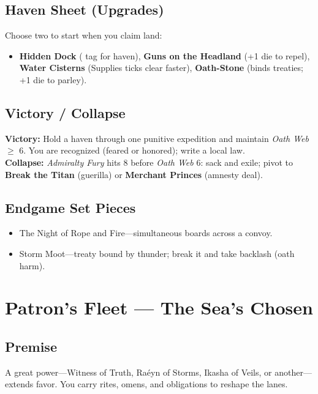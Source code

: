 \documentclass[11pt,oneside]{book}
\newcommand{\tagpill}[1]{\begingroup
  \setlength{\fboxsep}{1pt}\color{black}\fbox{\footnotesize\textsf{#1}}
\endgroup}
\begin{document}
\begin{itemize}
\subsection*{Haven Sheet (Upgrades)}
Choose two to start when you claim land:
\begin{itemize}[leftmargin=*,itemsep=2pt]
  \item \textbf{Hidden Dock} (\tagpill{HIDDEN HOLD} tag for haven), \textbf{Guns on the Headland} (+1 die to repel), \textbf{Water Cisterns} (Supplies ticks clear faster), \textbf{Oath-Stone} (binds treaties; +1 die to parley).
\end{itemize}

\subsection*{Victory / Collapse}
\textbf{Victory:} Hold a haven through one punitive expedition and maintain \emph{Oath Web} \(\geq\) 6. You are recognized (feared or honored); write a local law.\\
\textbf{Collapse:} \emph{Admiralty Fury} hits 8 before \emph{Oath Web} 6: sack and exile; pivot to \textbf{Break the Titan} (guerilla) or \textbf{Merchant Princes} (amnesty deal).

\subsection*{Endgame Set Pieces}
\begin{itemize}[leftmargin=*,itemsep=2pt]
  \item The Night of Rope and Fire---simultaneous boards across a convoy.
  \item Storm Moot---treaty bound by thunder; break it and take backlash (oath harm).
\end{itemize}

\section{\textbf{Patron's Fleet} --- The Sea's Chosen}

\subsection*{Premise}
A great power---Witness of Truth, Raéyn of Storms, Ikasha of Veils, or another---extends favor. You carry rites, omens, and obligations to reshape the lanes.


\end{itemize}
\end{document}
